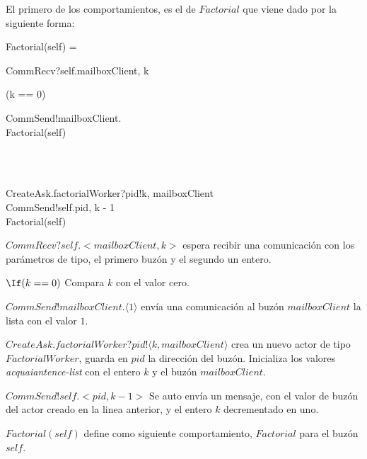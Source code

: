 El primero de los comportamientos, es el de $Factorial$ que viene dado por la siguiente forma:
\begin{process}
Factorial(self) = {} \\ \quad
  \begin{block}
  CommRecv?self.\langle mailboxClient, k \rangle \then {} \\ \quad
    \begin{block}
    \If (k == 0) \Then {} \\ \quad
      \begin{block} 
      CommSend!mailboxClient. \rangle \then \\
      Factorial(self) 
      \end{block} \\
    \Else {} \\ \quad
      \begin{block}
      CreateAsk.factorialWorker?pid!\langle k, mailboxClient \rangle \then \\
      CommSend!self.\langle pid, k - 1 \rangle \then \\
      Factorial(self)
      \end{block}
    \end{block}
  \end{block}
\end{process}


\begin{description}
 \item $CommRecv?self.<mailboxClient, k>$ espera recibir una comunicación con los parámetros de tipo, el primero buzón y el segundo un entero.
 \item $\If (k == 0)$ Compara $k$ con el valor cero.
 \item $CommSend!mailboxClient.\langle 1 \rangle$ envía una comunicación al buzón $mailboxClient$ la lista con el valor $1$.
 \item $CreateAsk.factorialWorker?pid!\langle k, mailboxClient \rangle$ crea un nuevo actor de tipo $FactorialWorker$, guarda en $pid$ la dirección del buzón. Inicializa los valores \textit{acquaiantence-list} con el entero $k$ y el buzón $mailboxClient$.
 \item $CommSend!self.<pid, k - 1 >$ Se auto envía un mensaje, con el valor de buzón del actor creado en la linea anterior, y el entero $k$ decrementado en uno.
 \item $Factorial(self)$ define como siguiente comportamiento, $Factorial$ para el buzón $self$.
\end{description}

